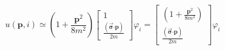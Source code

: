 \begin{equation}
u(\mathbf{p,}i)\simeq \left( 1+\frac{\mathbf{p}^{2}}{8m^{2}}\right) \left[ 
\begin{array}{c}
1 \\ 
\frac{(\overrightarrow{\mathbf{\sigma }}\mathbf{\cdot p})}{2m}
\end{array}
\right] \varphi _{i}=\left[ 
\begin{array}{c}
\left( 1+\frac{\mathbf{p}^{2}}{8m^{2}}\right) \\ 
\frac{(\overrightarrow{\mathbf{\sigma }}\mathbf{\cdot p})}{2m}
\end{array}
\right] \varphi _{i}
\end{equation}

